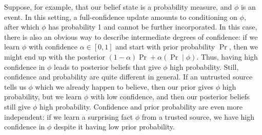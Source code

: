 Suppose, for example, that 
our belief state is a probability measure, and $\phi$ is an event. 
In this setting, 
a full-confidence update amounts to conditioning on $\phi$, after which $\phi$ has probability 1 and cannot be further incorporated.
In this case,
there is also an obvious way to describe intermediate degrees of confidence:
if we learn $\phi$ with confidence
$\alpha \in [0,1]$
and start with prior probability $\Pr$, then we might end up with the
posterior $(1-\alpha)\Pr + \alpha (\Pr\mid \phi)$.
%
Thus, having high confidence in $\phi$ leads to posterior beliefs that give $\phi$
high
probability.
Still, confidence and probability are quite different in general.
% 
If an untrusted source tells us $\phi$ which we already happen to believe, 
then our prior gives $\phi$ high probability, but we learn $\phi$ with low confidence, and then our posterior beliefs still give $\phi$ high probability.  
Confidence and prior probability are even more independent: 
if we learn a surprising fact $\phi$ from a trusted source, we have high confidence in $\phi$ despite it having low prior probability.


